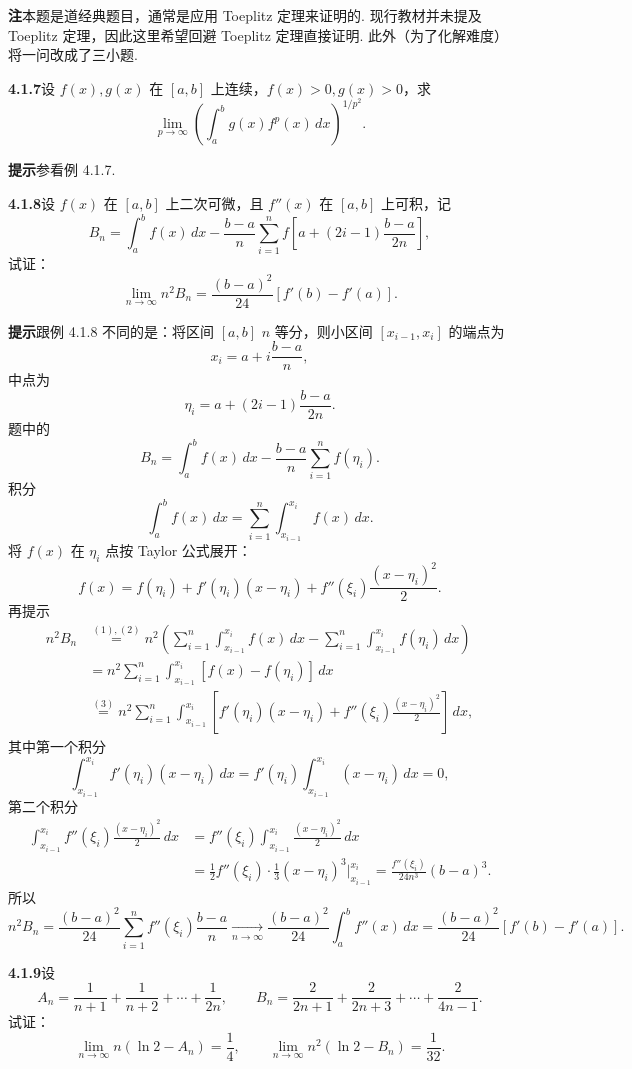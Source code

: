 \documentclass[UTF8,12pt,a4paper,fontset=fandol]{ctexart}
\begin{document}
\noindent\textbf{注}\quad 本题是道经典题目，通常是应用 Toeplitz 定理来证明的. 现行教材并未提及 Toeplitz 定理，因此这里希望回避 Toeplitz 定理直接证明. 此外（为了化解难度）将一问改成了三小题.

\noindent\textbf{4.1.7}\quad 设 $f(x),g(x)$ 在 $[a,b]$ 上连续，$f(x)>0,g(x)>0$，求
\[
\lim_{p\to\infty}\left(\int_a^b g(x)f^p(x)\,dx\right)^{1/p^2}.
\]

\noindent\textbf{提示}\quad 参看例 4.1.7.

\noindent\textbf{4.1.8}\quad 设 $f(x)$ 在 $[a,b]$ 上二次可微，且 $f''(x)$ 在 $[a,b]$ 上可积，记
\[
B_n=\int_a^b f(x)\,dx-\frac{b-a}{n}
\sum_{i=1}^n f\left[a+(2i-1)\frac{b-a}{2n}\right],
\]
试证：
\[
\lim_{n\to\infty}n^2B_n
=\frac{(b-a)^2}{24}[f'(b)-f'(a)].
\]

\noindent\textbf{提示}\quad 跟例 4.1.8 不同的是：将区间 $[a,b]$ $n$ 等分，则小区间 $[x_{i-1},x_i]$ 的端点为
\[
x_i=a+i\frac{b-a}{n},
\]
中点为
\[
\eta_i=a+(2i-1)\frac{b-a}{2n}.
\]
题中的
\[
B_n=\int_a^b f(x)\,dx-\frac{b-a}{n}\sum_{i=1}^n f(\eta_i).
\tag{1}
\]
积分
\[
\int_a^b f(x)\,dx=\sum_{i=1}^n\int_{x_{i-1}}^{x_i}f(x)\,dx.
\tag{2}
\]
将 $f(x)$ 在 $\eta_i$ 点按 Taylor 公式展开：
\[
f(x)=f(\eta_i)+f'(\eta_i)(x-\eta_i)
+f''(\xi_i)\frac{(x-\eta_i)^2}{2}.
\tag{3}
\]
再提示
\[
\begin{aligned}
n^2B_n
&\stackrel{(1),(2)}{=}
n^2\left(\sum_{i=1}^n\int_{x_{i-1}}^{x_i}f(x)\,dx
-\sum_{i=1}^n\int_{x_{i-1}}^{x_i}f(\eta_i)\,dx\right)\\
&=n^2\sum_{i=1}^n\int_{x_{i-1}}^{x_i}[f(x)-f(\eta_i)]\,dx\\
&\stackrel{(3)}{=}
n^2\sum_{i=1}^n\int_{x_{i-1}}^{x_i}
\left[f'(\eta_i)(x-\eta_i)+f''(\xi_i)\frac{(x-\eta_i)^2}{2}\right]\,dx,
\end{aligned}
\]
其中第一个积分
\[
\int_{x_{i-1}}^{x_i}f'(\eta_i)(x-\eta_i)\,dx
=f'(\eta_i)\int_{x_{i-1}}^{x_i}(x-\eta_i)\,dx=0,
\]
第二个积分
\[
\begin{aligned}
\int_{x_{i-1}}^{x_i}f''(\xi_i)\frac{(x-\eta_i)^2}{2}\,dx
&=f''(\xi_i)\int_{x_{i-1}}^{x_i}\frac{(x-\eta_i)^2}{2}\,dx\\
&=\frac12f''(\xi_i)\cdot\frac13(x-\eta_i)^3\bigg|_{x_{i-1}}^{x_i}
=\frac{f''(\xi_i)}{24n^3}(b-a)^3.
\end{aligned}
\]
所以
\[
n^2B_n=\frac{(b-a)^2}{24}
\sum_{i=1}^n f''(\xi_i)\frac{b-a}{n}
\xrightarrow[n\to\infty]{}
\frac{(b-a)^2}{24}\int_a^b f''(x)\,dx
=\frac{(b-a)^2}{24}[f'(b)-f'(a)].
\]

\noindent\textbf{4.1.9}\quad 设
\[
A_n=\frac1{n+1}+\frac1{n+2}+\cdots+\frac1{2n},\qquad
B_n=\frac2{2n+1}+\frac2{2n+3}+\cdots+\frac2{4n-1}.
\]
试证：
\[
\lim_{n\to\infty}n(\ln2-A_n)=\frac14,\qquad
\lim_{n\to\infty}n^2(\ln2-B_n)=\frac1{32}.
\]
\end{document}
